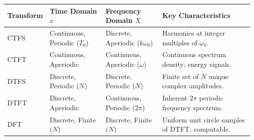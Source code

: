 \documentclass[12pt,a4paper]{article}
\renewcommand{\arraystretch}{1.45}
\begin{document}
\begin{tcolorbox}[tikzbox, title={\textbf{Summary Matrix: Comparison of Fourier Representations}}]
\par\vspace{4pt}\noindent
\begingroup
\setlength{\tabcolsep}{4pt}
\setlength{\extrarowheight}{3pt}
\renewcommand{\arraystretch}{1.35}
\begin{tabularx}{\linewidth}{|B{2.2cm}|B{3.2cm}|B{3.2cm}|Y|}
\hline
\textbf{Transform} & \textbf{Time Domain $x$} & \textbf{Frequency Domain $X$} & \textbf{Key Characteristics} \\
\hline
CTFS & Continuous, Periodic ($T_0$) & Discrete, Aperiodic ($k\omega_0$) & Harmonics at integer multiples of $\omega_0$. \\
\hline
CTFT & Continuous, Aperiodic & Continuous, Aperiodic ($\omega$) & Continuous spectrum density; energy signals. \\
\hline
DTFS & Discrete, Periodic ($N$) & Discrete, Periodic ($N$) & Finite set of $N$ unique complex amplitudes. \\
\hline
DTFT & Discrete, Aperiodic & Continuous, Periodic ($2\pi$) & Inherent $2\pi$ periodic frequency spectrum. \\
\hline
DFT & Discrete, Finite ($N$) & Discrete, Finite ($N$) & Uniform unit circle samples of DTFT; computable. \\
\hline
\end{tabularx}
\endgroup
\end{tcolorbox}
\end{document}
